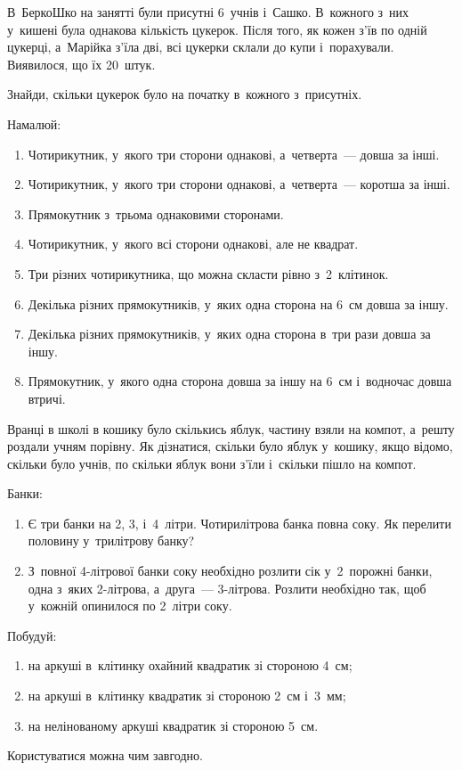 \problem
В~БеркоШко на занятті були присутні 6~учнів і~Сашко.
В~кожного з~них у~кишені була однакова кількість цукерок.
Після того, як кожен з'їв по одній цукерці,
а~Марійка з'їла дві, всі цукерки склали до купи і~порахували.
Виявилося, що їх 20~штук.

Знайди, скільки цукерок було на початку в~кожного з~присутніх.


\problem
Намалюй:
\begin{enumerate}
  \item Чотирикутник, у~якого три сторони однакові,
  а~четверта~--- довша за інші.
  \item Чотирикутник, у~якого три сторони однакові,
  а~четверта~--- коротша за інші.
  \item Прямокутник з~трьома однаковими сторонами.
  \item Чотирикутник, у~якого всі сторони однакові, але не квадрат.
  \item Три різних чотирикутника, що можна скласти рівно з~2~клітинок.
  \item Декілька різних прямокутників, у~яких одна сторона
  на 6~см довша за іншу.
  \item Декілька різних прямокутників, у~яких одна сторона
  в~три рази довша за іншу.
  \item Прямокутник, у~якого одна сторона довша за іншу на 6~см
  і~водночас довша втричі.
\end{enumerate}


\problem
Вранці в школі в кошику було скількись яблук, частину взяли на компот,
а~решту роздали учням порівну.
Як дізнатися, скільки було яблук у~кошику, якщо відомо, скільки було учнів,
по скільки яблук вони з'їли і~скільки пішло на компот.


\problem
Банки:
\begin{enumerate}
  \item Є три банки на 2, 3, і~4~літри. Чотирилітрова банка повна соку.
  Як перелити половину у~трилітрову банку?
  \item З~повної 4-літрової банки соку необхідно розлити сік
  у~2~порожні банки, одна з~яких 2-літрова, а~друга~--- 3-літрова.
  Розлити необхідно так, щоб у~кожній опинилося по 2~літри соку.
\end{enumerate}


\problem
Побудуй:
\begin{enumerate}
  \item на аркуші в~клітинку охайний квадратик зі стороною 4~см;
  \item на аркуші в~клітинку квадратик зі стороною 2~см і~3~мм;
  \item на нелінованому аркуші квадратик зі стороною 5~см.
\end{enumerate}
Користуватися можна чим завгодно.


